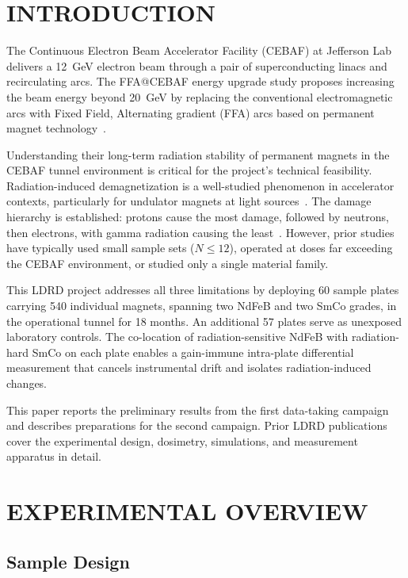 \documentclass[a4paper,
               ]{jacow}
\begin{document}
\section{INTRODUCTION}

The Continuous Electron Beam Accelerator Facility (CEBAF) at Jefferson Lab delivers a \SI{12}{GeV} electron beam through a pair of superconducting linacs and recirculating arcs. The FFA@CEBAF energy upgrade study proposes increasing the beam energy beyond \SI{20}{GeV} by replacing the conventional electromagnetic arcs with Fixed Field, Alternating gradient (FFA) arcs based on permanent magnet technology~\cite{Khan:ipac2024-mopr08}.

Understanding their long-term radiation stability of permanent magnets in the CEBAF tunnel environment is critical for the project's technical feasibility. Radiation-induced demagnetization is a well-studied phenomenon in accelerator contexts, particularly for undulator magnets at light sources~\cite{Bizen:2016}. The damage hierarchy is established: protons cause the most damage, followed by neutrons, then electrons, with gamma radiation causing the least~\cite{Shepherd:Radiation, Shen:2018}. However, prior studies have typically used small sample sets ($N \leq 12$), operated at doses far exceeding the CEBAF environment, or studied only a single material family.

This LDRD project addresses all three limitations by deploying 60 sample plates carrying 540 individual magnets, spanning two NdFeB and two SmCo grades, in the operational tunnel for 18 months. An additional 57 plates serve as unexposed laboratory controls. The co-location of radiation-sensitive NdFeB with radiation-hard SmCo on each plate enables a gain-immune intra-plate differential measurement that cancels instrumental drift and isolates radiation-induced changes.

This paper reports the preliminary results from the first data-taking campaign and describes preparations for the second campaign. Prior LDRD publications~\cite{Bodenstein:ipac2024-thps58, Bodenstein:ipac2025-thpb093, Bodenstein:napac25-wean02} cover the experimental design, dosimetry, simulations, and measurement apparatus in detail.

\section{EXPERIMENTAL OVERVIEW}

\subsection{Sample Design}
\end{document}
